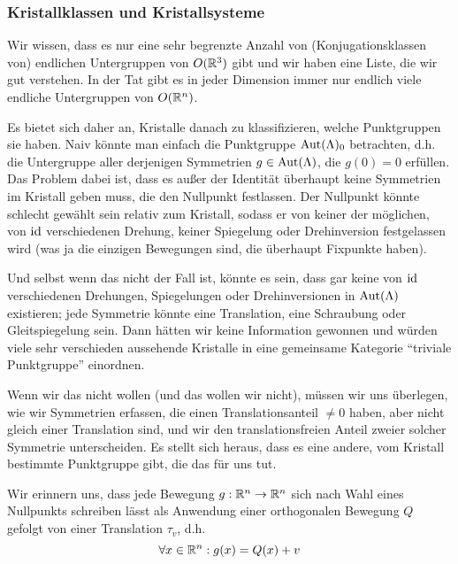 \subsubsection{Kristallklassen und Kristallsysteme}

\begin{remark}
Wir wissen, dass es nur eine sehr begrenzte Anzahl von (Konjugationsklassen von) endlichen Untergruppen von $O(\mathbb{R}^3)$ gibt und wir haben eine Liste, die wir gut verstehen. In der Tat gibt es in jeder Dimension immer nur endlich viele endliche Untergruppen von $O(\mathbb{R}^n)$.

Es bietet sich daher an, Kristalle danach zu klassifizieren, welche Punktgruppen sie haben. Naiv könnte man einfach die Punktgruppe $\operatorname{Aut}(\Lambda)_0$ betrachten, d.h. die Untergruppe aller derjenigen Symmetrien $g\in\operatorname{Aut}(\Lambda)$, die $g(0)=0$ erfüllen. Das Problem dabei ist, dass es außer der Identität überhaupt keine Symmetrien im Kristall geben muss, die den Nullpunkt festlassen. Der Nullpunkt könnte schlecht gewählt sein relativ zum Kristall, sodass er von keiner der möglichen, von $\operatorname{id}$ verschiedenen Drehung, keiner Spiegelung oder Drehinversion festgelassen wird (was ja die einzigen Bewegungen sind, die überhaupt Fixpunkte haben).

Und selbst wenn das nicht der Fall ist, könnte es sein, dass gar keine von $\operatorname{id}$ verschiedenen Drehungen, Spiegelungen oder Drehinversionen in $\operatorname{Aut}(\Lambda)$ existieren; jede Symmetrie könnte eine Translation, eine Schraubung oder Gleitspiegelung sein. Dann hätten wir keine Information gewonnen und würden viele sehr verschieden aussehende Kristalle in eine gemeinsame Kategorie \enquote{triviale Punktgruppe} einordnen.

Wenn wir das nicht wollen (und das wollen wir nicht), müssen wir uns überlegen, wie wir Symmetrien erfassen, die einen Translationsanteil $\neq 0$ haben, aber nicht gleich einer Translation sind, und wir den translationsfreien Anteil zweier solcher Symmetrie unterscheiden. Es stellt sich heraus, dass es eine andere, vom Kristall bestimmte Punktgruppe gibt, die das für uns tut.
\end{remark}

\begin{remark}
Wir erinnern uns, dass jede Bewegung $g:\mathbb{R}^n\to\mathbb{R}^n$ sich nach Wahl eines Nullpunkts schreiben lässt als Anwendung einer orthogonalen Bewegung $Q$ gefolgt von einer Translation $\tau_v$, d.h.
\[\forall x\in\mathbb{R}^n: g(x)=Q(x)+v\]
\end{remark}

